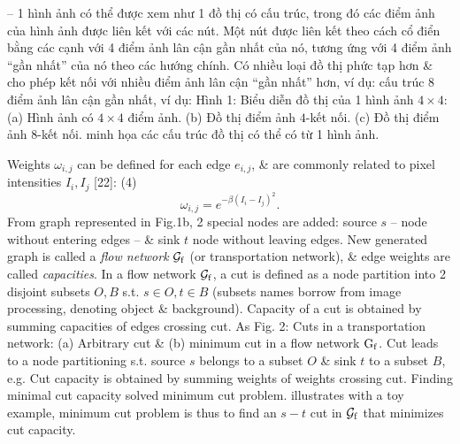 \documentclass{article}
\begin{document}
\begin{itemize}
\begin{itemize}
        -- 1 hình ảnh có thể được xem như 1 đồ thị có cấu trúc, trong đó các điểm ảnh của hình ảnh được liên kết với các nút. Một nút được liên kết theo cách cổ điển bằng các cạnh với 4 điểm ảnh lân cận gần nhất của nó, tương ứng với 4 điểm ảnh ``gần nhất'' của nó theo các hướng chính. Có nhiều loại đồ thị phức tạp hơn \& cho phép kết nối với nhiều điểm ảnh lân cận ``gần nhất'' hơn, ví dụ: cấu trúc $8$ điểm ảnh lân cận gần nhất, ví dụ: {\sf Hình 1: Biểu diễn đồ thị của 1 hình ảnh $4\times4$: (a) Hình ảnh có $4\times4$ điểm ảnh. (b) Đồ thị điểm ảnh $4$-kết nối. (c) Đồ thị điểm ảnh $8$-kết nối.} minh họa các cấu trúc đồ thị có thể có từ 1 hình ảnh.
        
        Weights $\omega_{i,j}$ can be defined for each edge $e_{i,j}$, \& are commonly related to pixel intensities $I_i,I_j$ [22]: (4)
        \begin{equation*}
            \omega_{i,j} = e^{-\beta(I_i - I_j)^2}.
        \end{equation*}
        From graph represented in {\sf Fig.1b}, 2 special nodes are added: source $s$ -- node without entering edges -- \& sink $t$ node without leaving edges. New generated graph is called a {\it flow network} ${\cal G}_{\rm f}$ (or transportation network), \& edge weights are called {\it capacities}. In a flow network ${\cal G}_{\rm f}$, a cut is defined as a node partition into 2 disjoint subsets $O,B$ s.t. $s\in O,t\in B$ (subsets names borrow from image processing, denoting object \& background). Capacity of a cut is obtained by summing capacities of edges crossing cut. As {\sf Fig. 2: Cuts in a transportation network: (a) Arbitrary cut \& (b) minimum cut in a flow network ${\rm G}_{\rm f}$. Cut leads to a node partitioning s.t. source $s$ belongs to a subset $O$ \& sink $t$ to a subset $B$, e.g. Cut capacity is obtained by summing weights of weights crossing cut. Finding minimal cut capacity solved minimum cut problem.} illustrates with a toy example, minimum cut problem is thus to find an $s - t$ cut in ${\cal G}_{\rm f}$ that minimizes cut capacity.
        

\end{itemize}
\end{itemize}
\end{document}
